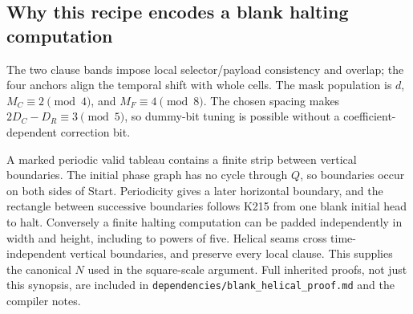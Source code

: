 \documentclass[11pt,a4paper]{article}
\theoremstyle{remark}\newtheorem{remark}[theorem]{Remark}
\newcommand{\src}[1]{\nolinkurl{#1}}
\begin{document}
\subsection{Why this recipe encodes a blank halting computation}
The two clause bands impose local selector/payload consistency and
overlap; the four anchors align the temporal shift with whole cells.
The mask population is $d$, $M_C\equiv2\pmod4$, and
$M_F\equiv4\pmod8$. The chosen spacing makes
$2D_C-D_R\equiv3\pmod5$, so dummy-bit tuning is possible without
a coefficient-dependent correction bit.

A marked periodic valid tableau contains a finite strip between
vertical boundaries. The initial phase graph has no cycle through
$Q$, so boundaries occur on both sides of Start. Periodicity gives
a later horizontal boundary, and the rectangle between successive
boundaries follows K215 from one blank initial head to halt.
Conversely a finite halting computation can be padded independently
in width and height, including to powers of five. Helical seams
cross time-independent vertical boundaries, and preserve every local
clause. This supplies the canonical $N$ used in the square-scale
argument. Full inherited proofs, not just this synopsis, are included
in \src{dependencies/blank_helical_proof.md} and the compiler notes.
\end{document}
